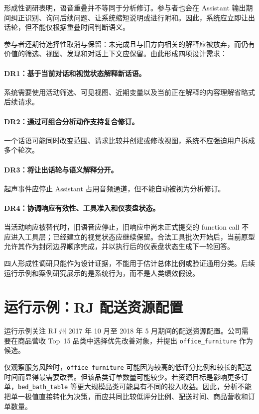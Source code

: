 \documentclass[UTF8,a4paper,10.5pt]{ctexart}
\begin{document}
形成性调研表明，语音重叠并不等同于分析修订。参与者也会在 Assistant 输出期间纠正识别、询问后续问题、让系统缩短说明或进行附和。因此，系统应立即让出话轮，但不能仅根据重叠时间判断语义。

参与者还期待选择性取消与保留：未完成且与旧方向相关的解释应被放弃，而仍有价值的筛选、视图、发现和对话上下文应保留。由此形成四项设计需求：

\paragraph{DR1：基于当前对话和视觉状态解释新话语。}
系统需要使用活动筛选、可见视图、近期变量以及当前正在解释的内容理解省略式后续请求。

\paragraph{DR2：通过可组合分析动作支持复合修订。}
一个话语可能同时改变范围、请求比较并创建或修改视图，系统不应强迫用户拆成多个轮次。

\paragraph{DR3：将让出话轮与语义解释分开。}
起声事件应停止 Assistant 占用音频通道，但不能自动被视为分析修订。

\paragraph{DR4：协调响应有效性、工具准入和仪表盘状态。}
当活动响应被替代时，旧语音应停止，旧响应中尚未正式提交的 function call 不应进入工具层；已经建立的视觉状态应继续保留。合法工具批次开始后，当前原型允许其作为封闭边界顺序完成，并以执行后的仪表盘状态生成下一轮回答。

四人形成性调研只能作为设计证据，不能用于估计总体比例或验证通用分类。后续运行示例和案例研究展示的是系统行为，而不是人类绩效假设。

\section{运行示例：RJ 配送资源配置}

运行示例关注 RJ 州 2017 年 10 月至 2018 年 5 月期间的配送资源配置。公司需要在商品营收 Top~15 品类中选择优先改善对象，并提出 \texttt{office\_furniture} 作为候选。

仅观察服务风险时，\texttt{office\_furniture} 可能因为较高的低评分比例和较长的配送时间而显得最需要改善。但该品类订单数量可能较少。若资源目标是影响更多订单，\texttt{bed\_bath\_table} 等更大规模品类可能具有不同的投入收益。因此，分析不能把单一极值直接转化为决策，而应共同比较低评分比例、配送时间、商品营收和订单数量。
\end{document}
